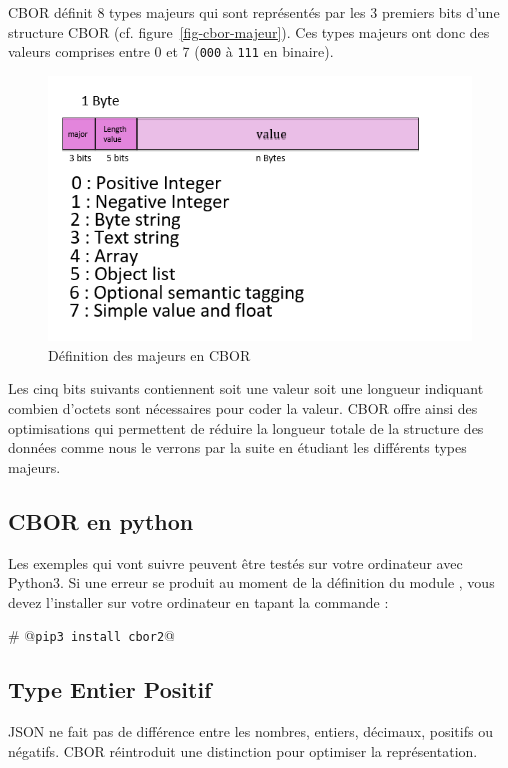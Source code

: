 CBOR définit 8 types majeurs qui sont représentés par les 3 premiers bits d'une structure CBOR (cf. figure~\vref{fig-cbor-majeur}). Ces types majeurs ont donc des valeurs comprises entre 0 et 7 (\texttt{000} à \texttt{111} en binaire).

\begin{figure}[tbp]
\centerline{\includegraphics[width=1\columnwidth]{Pictures/cbor1.png}}
\caption{Définition des majeurs en CBOR}
\label{fig-cbor-majeur}
\end{figure}


Les cinq bits suivants contiennent soit une valeur soit une longueur indiquant combien d'octets sont nécessaires pour coder la valeur. \ac{CBOR} offre ainsi des optimisations qui permettent de réduire la longueur totale de la structure des données comme nous le verrons par la suite en étudiant les différents types majeurs.

\subsection{CBOR en python}
Les exemples qui vont suivre peuvent être testés sur votre ordinateur avec Python3. Si une erreur se produit au moment de la définition du module \texttt{}, vous devez l'installer sur votre ordinateur en tapant la commande :

\begin{termc}[backgroundcolor=\color{gray!10}, language=json, basicstyle=\ttfamily\small, escapechar=@]
# @\texttt{pip3 install cbor2}@
\end{termc}


\subsection{Type Entier Positif}
\ac{JSON} ne fait pas de différence entre les nombres, entiers, décimaux, positifs ou négatifs. \ac{CBOR} réintroduit une distinction pour optimiser la représentation.

